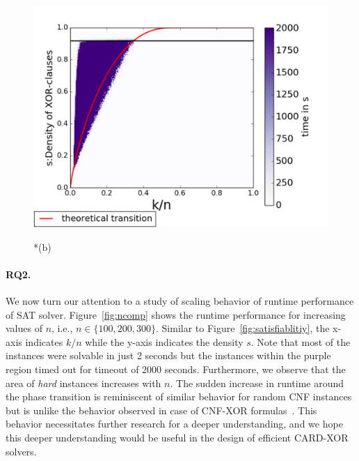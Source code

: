 \begin{figure}
\begin{multicols}{2}
		\includegraphics[width=\linewidth,height=\linewidth]{pb-experiments/polarity-false/adder/250_false.pdf}\par
		*{(b)}
	\end{multicols}
		\label{fig:caching} 
\end{figure}

\paragraph{\bf{RQ2.}}We now turn our attention to a study of scaling behavior of runtime performance of SAT solver. Figure~\ref{fig:ncomp} shows the runtime performance for increasing values of $n$, i.e., $n \in \{100,200,300\}$. Similar to Figure~\ref{fig:satisfiablitiy}, the x-axis indicates  $k/n$ while the y-axis indicates the density $s$. Note that most of the instances were solvable in just 2 seconds but the instances within the purple region timed out for timeout of 2000 seconds. Furthermore, we observe that the area of {\em hard} instances increases with $n$. The sudden increase in runtime around the phase transition is reminiscent of similar behavior for random CNF instances but is unlike the behavior observed in case of CNF-XOR formulas~\cite{DMV17}. This behavior necessitates further research for a deeper understanding, and we hope this deeper understanding would be useful in the design of efficient CARD-XOR solvers.  
